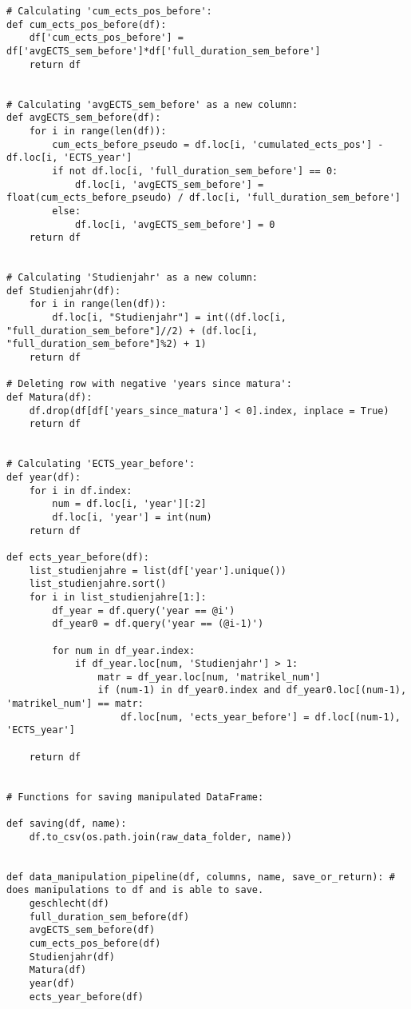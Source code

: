 \begin{lstlisting}
# Calculating 'cum_ects_pos_before':
def cum_ects_pos_before(df):
    df['cum_ects_pos_before'] = df['avgECTS_sem_before']*df['full_duration_sem_before']
    return df

        
# Calculating 'avgECTS_sem_before' as a new column:
def avgECTS_sem_before(df):
    for i in range(len(df)):
        cum_ects_before_pseudo = df.loc[i, 'cumulated_ects_pos'] - df.loc[i, 'ECTS_year']
        if not df.loc[i, 'full_duration_sem_before'] == 0:
            df.loc[i, 'avgECTS_sem_before'] = float(cum_ects_before_pseudo) / df.loc[i, 'full_duration_sem_before']
        else:
            df.loc[i, 'avgECTS_sem_before'] = 0
    return df 


# Calculating 'Studienjahr' as a new column:
def Studienjahr(df):
    for i in range(len(df)):
        df.loc[i, "Studienjahr"] = int((df.loc[i, "full_duration_sem_before"]//2) + (df.loc[i, "full_duration_sem_before"]%2) + 1)
    return df

# Deleting row with negative 'years since matura':
def Matura(df):
    df.drop(df[df['years_since_matura'] < 0].index, inplace = True)
    return df
    

# Calculating 'ECTS_year_before':
def year(df):
    for i in df.index:
        num = df.loc[i, 'year'][:2]
        df.loc[i, 'year'] = int(num)
    return df

def ects_year_before(df):  
    list_studienjahre = list(df['year'].unique())
    list_studienjahre.sort()
    for i in list_studienjahre[1:]:
        df_year = df.query('year == @i')
        df_year0 = df.query('year == (@i-1)')
        
        for num in df_year.index:
            if df_year.loc[num, 'Studienjahr'] > 1:
                matr = df_year.loc[num, 'matrikel_num']
                if (num-1) in df_year0.index and df_year0.loc[(num-1), 'matrikel_num'] == matr:
                    df.loc[num, 'ects_year_before'] = df.loc[(num-1), 'ECTS_year']
            
    return df


# Functions for saving manipulated DataFrame:

def saving(df, name):
    df.to_csv(os.path.join(raw_data_folder, name))


def data_manipulation_pipeline(df, columns, name, save_or_return): # does manipulations to df and is able to save.
    geschlecht(df)
    full_duration_sem_before(df)
    avgECTS_sem_before(df)
    cum_ects_pos_before(df)
    Studienjahr(df)
    Matura(df)
    year(df)
    ects_year_before(df)
    

\end{lstlisting}
